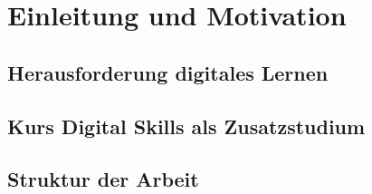 \section{Einleitung und Motivation}\label{einleitung}
\subsection{Herausforderung digitales Lernen}
\subsection{Kurs Digital Skills als Zusatzstudium}
\subsection{Struktur der Arbeit}